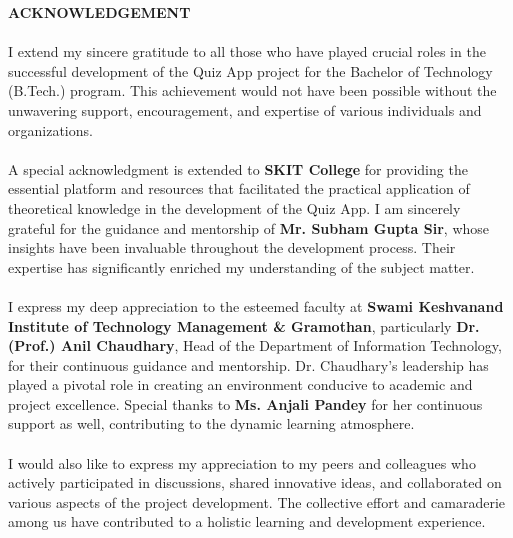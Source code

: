 \begin{center}

\vspace{7cm}
\LARGE{\textbf{ACKNOWLEDGEMENT}}\\[1cm]
\end{center}
\linespread{1}

\large{\paragraph{}
I extend my sincere gratitude to all those who have played crucial roles in the successful development of the Quiz App project for the Bachelor of Technology (B.Tech.) program. This achievement would not have been possible without the unwavering support, encouragement, and expertise of various individuals and organizations.}

\large{\paragraph{}
A special acknowledgment is extended to \textbf{SKIT College} for providing the essential platform and resources that facilitated the practical application of theoretical knowledge in the development of the Quiz App. I am sincerely grateful for the guidance and mentorship of \textbf{Mr. Subham Gupta Sir}, whose insights have been invaluable throughout the development process. Their expertise has significantly enriched my understanding of the subject matter.}

\large{\paragraph{}
I express my deep appreciation to the esteemed faculty at \textbf{Swami Keshvanand Institute of Technology Management \& Gramothan}, particularly \textbf{Dr. (Prof.) Anil Chaudhary}, Head of the Department of Information Technology, for their continuous guidance and mentorship. Dr. Chaudhary's leadership has played a pivotal role in creating an environment conducive to academic and project excellence. Special thanks to \textbf{Ms. Anjali Pandey} for her continuous support as well, contributing to the dynamic learning atmosphere.}

\large{\paragraph{}
I would also like to express my appreciation to my peers and colleagues who actively participated in discussions, shared innovative ideas, and collaborated on various aspects of the project development. The collective effort and camaraderie among us have contributed to a holistic learning and development experience.}

